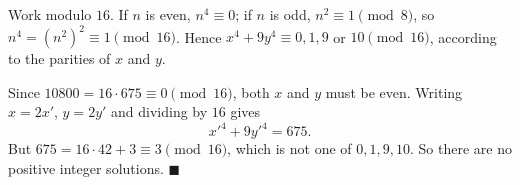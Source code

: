 Work modulo $16$. If $n$ is even, $n^4\equiv0$; if $n$ is odd, $n^2\equiv1\pmod8$, so $n^4=(n^2)^2\equiv1\pmod{16}$. Hence $x^4+9y^4\equiv0,1,9$ or $10\pmod{16}$, according to the parities of $x$ and $y$.

Since $10800=16\cdot675\equiv0\pmod{16}$, both $x$ and $y$ must be even. Writing $x=2x'$, $y=2y'$ and dividing by $16$ gives
\[x'^4+9y'^4=675.\]
But $675=16\cdot42+3\equiv3\pmod{16}$, which is not one of $0,1,9,10$. So there are no positive integer solutions. $\blacksquare$

